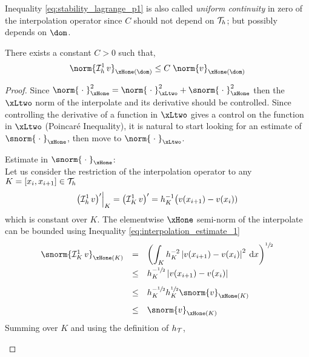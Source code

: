 Inequality \eqref{eq:stability_lagrange_p1} is also called \textit{uniform continuity} in zero of the interpolation operator since $C$ should not depend on ${\mathcal T}_h$; but possibly depends on $\dom$.

\begin{prpstn}
\label{prpstn:stability_lagrange_p1}
There exists a constant $C>0$ such that,
\begin{equation}\label{eq:stability_lagrange_p1}
\norm{\Lgrh{1} v}_{\xHone(\dom)} \leq C\; \norm{v}_{\xHone(\dom)}
\end{equation}
\end{prpstn}
\begin{proof}
Since $\norm{\;\cdot\;}^2_{\xHone} = \norm{\;\cdot\;}^2_{\xLtwo} + \snorm{\;\cdot\;}^2_{\xHone}$ then the $\xLtwo$ norm of the interpolate and its derivative should be controlled. Since controlling the derivative of a function in $\xLtwo$ gives a control on the function in $\xLtwo$ (Poincaré Inequality), it is natural to start looking for an estimate of $\snorm{\;\cdot\;}_{\xHone}$, then move to $\norm{\;\cdot\;}_{\xLtwo}$.
\begin{tmaproofitems}
\item Estimate in $\snorm{\;\cdot\;}_{\xHone}$:\\
Let us consider the restriction of the interpolation operator to any $K = [x_{i}, x_{i+1}] \in {\mathcal T}_h$
\[
\Restrict{\bigl(\Lgrh{1}v\bigr)'}{K} = \bigl(\LgrK{1}v\bigr)' = h_K^{-1}\bigl(v(x_{i+1})- v(x_{i}))
\]
which is constant over $K$.
The elementwise $\xHone$ semi-norm of the interpolate can be bounded using Inequality \eqref{eq:interpolation_estimate_1}
\begin{equation*}
\begin{array}{lcl}
\snorm{\LgrK{1}v}_{\xHone(K)} &=&\displaystyle \left(\int_K h_K^{-2}\Abs{v(x_{i+1})- v(x_{i})}^2 \md x\right)^{\sfrac{1}{2}}\\[2ex]
                              &\leq& h_K^{-\sfrac{1}{2}}\Abs{v(x_{i+1})- v(x_{i})}\\[2ex]
                              &\leq& h_K^{-\sfrac{1}{2}} h_K^{\sfrac{1}{2}}\snorm{v}_{\xHone(K)}\\[2ex]
                              &\leq& \snorm{v}_{\xHone(K)}\\
\end{array}
\end{equation*}
Summing over $K$ and using the definition of $h_{\mathcal T}$,
\begin{equation*}

\end{equation*}
\end{tmaproofitems}
\end{proof}
